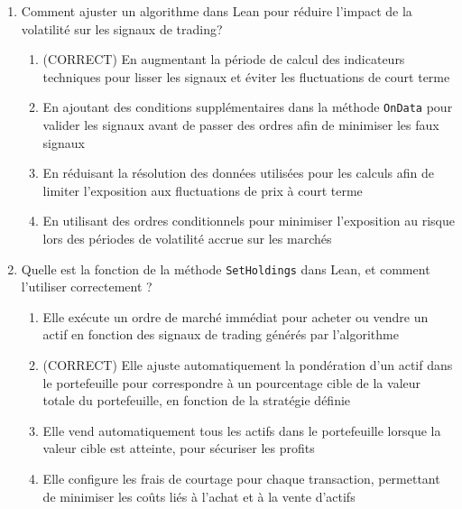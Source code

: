 \documentclass[a4paper,12pt]{article}
\begin{document}
\begin{enumerate}
    \item Comment ajuster un algorithme dans Lean pour réduire l'impact de la volatilité sur les signaux de trading?
    \begin{enumerate}[label=(\Alph*)]
        \item (CORRECT) En augmentant la période de calcul des indicateurs techniques pour lisser les signaux et éviter les fluctuations de court terme
        \item En ajoutant des conditions supplémentaires dans la méthode \texttt{OnData} pour valider les signaux avant de passer des ordres afin de minimiser les faux signaux
        \item En réduisant la résolution des données utilisées pour les calculs afin de limiter l'exposition aux fluctuations de prix à court terme
        \item En utilisant des ordres conditionnels pour minimiser l'exposition au risque lors des périodes de volatilité accrue sur les marchés
    \end{enumerate}

    \item Quelle est la fonction de la méthode \texttt{SetHoldings} dans Lean, et comment l'utiliser correctement ?
    \begin{enumerate}[label=(\Alph*)]
        \item Elle exécute un ordre de marché immédiat pour acheter ou vendre un actif en fonction des signaux de trading générés par l'algorithme
        \item (CORRECT) Elle ajuste automatiquement la pondération d'un actif dans le portefeuille pour correspondre à un pourcentage cible de la valeur totale du portefeuille, en fonction de la stratégie définie
        \item Elle vend automatiquement tous les actifs dans le portefeuille lorsque la valeur cible est atteinte, pour sécuriser les profits
        \item Elle configure les frais de courtage pour chaque transaction, permettant de minimiser les coûts liés à l'achat et à la vente d'actifs
    \end{enumerate}


\end{enumerate}
\end{document}
